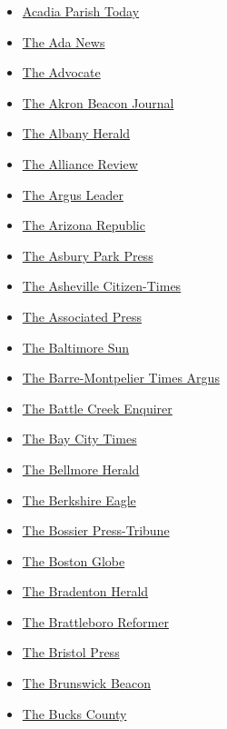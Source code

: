 \begin{itemize}
\tightlist
\item
  \href{https://www.crowleypostsignal.com/}{Acadia Parish Today}
\item
  \href{https://www.theadanews.com/\%20}{The Ada News}
\item
  \href{https://www.theadvocate.com/}{The Advocate}
\item
  \href{https://www.beaconjournal.com/}{The Akron Beacon Journal}
\item
  \href{https://www.albanyherald.com/}{The Albany Herald}
\item
  \href{https://www.the-review.com/}{The Alliance Review}
\item
  \href{https://www.argusleader.com/}{The Argus Leader}
\item
  \href{https://www.azcentral.com/}{The Arizona Republic}
\item
  \href{https://www.app.com/}{The Asbury Park Press}
\item
  \href{https://www.citizen-times.com/}{The Asheville Citizen-Times}
\item
  \href{https://apnews.com/}{The Associated Press}
\item
  \href{https://www.baltimoresun.com/}{The Baltimore Sun}
\item
  \href{https://www.timesargus.com/}{The Barre-Montpelier Times Argus}
\item
  \href{https://www.battlecreekenquirer.com/}{The Battle Creek Enquirer}
\item
  \href{https://www.mlive.com/saginaw-bay-city/}{The Bay City Times}
\item
  \href{https://www.liherald.com/bellmore/}{The Bellmore Herald}
\item
  \href{https://www.berkshireeagle.com/}{The Berkshire Eagle}
\item
  \href{https://bossierpress.com/}{The Bossier Press-Tribune}
\item
  \href{https://www.bostonglobe.com/}{The Boston Globe}
\item
  \href{https://www.bradenton.com/}{The Bradenton Herald}
\item
  \href{https://www.reformer.com/}{The Brattleboro Reformer}
\item
  \href{http://www.bristolpress.com/}{The Bristol Press}
\item
  \href{https://www.brunswickbeacon.com/}{The Brunswick Beacon}
\item
  \href{https://www.buckscountycouriertimes.com/}{The Bucks County
}
\end{itemize}
